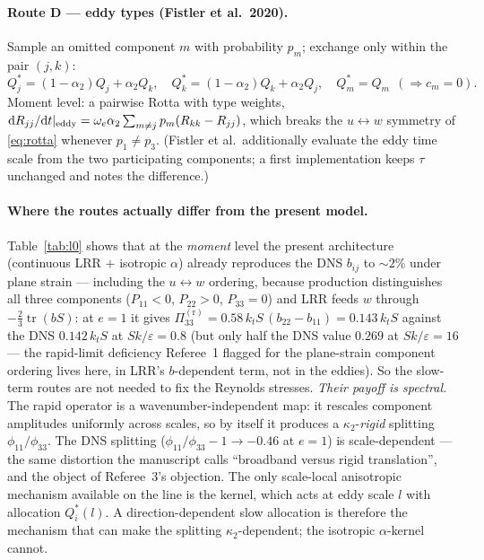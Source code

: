 \documentclass[11pt,a4paper]{article}
\newcommand{\Pir}[1]{\Pi^{(\mathrm r)}_{#1}}
\newcommand{\kt}{k_t}
\newcommand{\Qs}{Q^{*}}
\begin{document}
\paragraph{Route D --- eddy types (Fistler et al.\ 2020).}
Sample an omitted component $m$ with probability $p_m$; exchange only
within the pair $(j,k)$:
\begin{equation}
  \Qs_j=(1-\alpha_2)Q_j+\alpha_2Q_k,\quad
  \Qs_k=(1-\alpha_2)Q_k+\alpha_2Q_j,\quad
  \Qs_m=Q_m\ \ (\Rightarrow c_m=0).
  \label{eq:routeD}
\end{equation}
Moment level: a pairwise Rotta with type weights,
$\mathrm dR_{jj}/\mathrm dt|_{\rm eddy}=\omega_e\alpha_2\sum_{m\ne j}p_m(R_{kk}-R_{jj})$,
which breaks the $u\leftrightarrow w$ symmetry of \eqref{eq:rotta}
whenever $p_1\ne p_3$. (Fistler et al.\ additionally evaluate the eddy
time scale from the two participating components; a first implementation
keeps $\tau$ unchanged and notes the difference.)

\paragraph{Where the routes actually differ from the present model.}
Table~\ref{tab:l0} shows that at the \emph{moment} level the present
architecture (continuous LRR $+$ isotropic $\alpha$) already reproduces
the DNS $b_{ij}$ to $\sim2\%$ under plane strain --- including the
$u\leftrightarrow w$ ordering, because production distinguishes all three
components ($P_{11}<0$, $P_{22}>0$, $P_{33}=0$) and LRR feeds $w$ through
$-\tfrac23\operatorname{tr}(bS)$: at $e=1$ it gives
$\Pir{33}=0.58\,\kt S\,(b_{22}-b_{11})=0.143\,\kt S$ against the DNS
$0.142\,\kt S$ at $Sk/\varepsilon=0.8$ (but only half the DNS value
$0.269$ at $Sk/\varepsilon=16$ --- the rapid-limit deficiency Referee~1
flagged for the plane-strain component ordering lives here, in LRR's
$b$-dependent term, not in the eddies). So the slow-term routes are not
needed to fix the Reynolds stresses. \emph{Their payoff is spectral.} The
rapid operator is a wavenumber-independent map: it rescales component
amplitudes uniformly across scales, so by itself it produces a
$\kappa_2$-\emph{rigid} splitting $\phi_{11}/\phi_{33}$. The DNS splitting
($\phi_{11}/\phi_{33}-1\to-0.46$ at $e=1$) is scale-dependent --- the
same distortion the manuscript calls ``broadband versus rigid
translation'', and the object of Referee~3's objection. The only
scale-local anisotropic mechanism available on the line is the kernel,
which acts at eddy scale $l$ with allocation $\Qs_i(l)$. A
direction-dependent slow allocation is therefore the mechanism that can
make the splitting $\kappa_2$-dependent; the isotropic $\alpha$-kernel
cannot.
\end{document}
